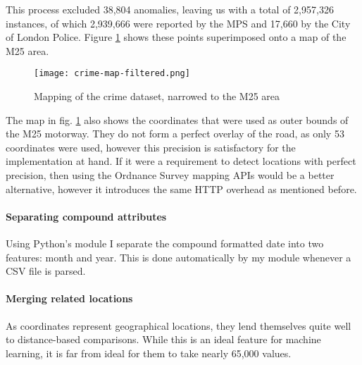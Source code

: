 \documentclass{article}
\begin{document}
	This process excluded 38,804 anomalies, leaving us with a total of 2,957,326 instances, of which 2,939,666 were reported by the MPS and 17,660 by the City of London Police. Figure \ref{fig:map-filtered} shows these points superimposed onto a map of the M25 area.

	\begin{figure}[H]
		\centering
		\texttt{[image: crime-map-filtered.png]}

		\scriptsize
		\hfill

		\caption{Mapping of the crime dataset, narrowed to the M25 area}
		\label{fig:map-filtered}
	\end{figure}

The map in fig. \ref{fig:map-filtered} also shows the coordinates that were used as outer bounds of the M25 motorway. They do not form a perfect overlay of the road, as only 53 coordinates were used, however this precision is satisfactory for the implementation at hand. If it were a requirement to detect locations with perfect precision, then using the Ordnance Survey mapping APIs would be a better alternative, however it introduces the same HTTP overhead as mentioned before.

	\paragraph{Separating compound attributes}

	Using Python's  module I separate the compound  formatted date into two features: month and year. This is done automatically by my  module whenever a CSV file is parsed.

	\paragraph{Merging related locations}

	As coordinates represent geographical locations, they lend themselves quite well to distance-based comparisons. While this is an ideal feature for machine learning, it is far from ideal for them to take nearly 65,000 values.
\end{document}
